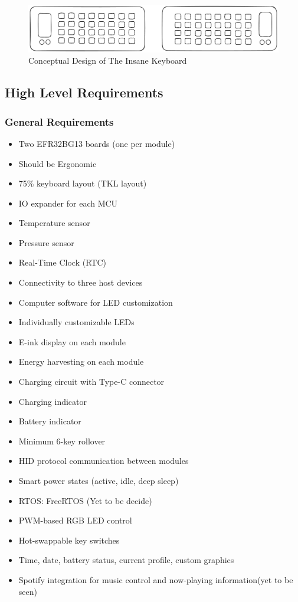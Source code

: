 \documentclass[a4paper,11pt]{article}%
\begin{document}
\begin{figure}[H]
    \centering
    \includegraphics[scale=0.38]{figures/concept.png}
    \caption{Conceptual Design of The Insane Keyboard}
\end{figure}
\vspace{0.2cm}





\subsection{High Level Requirements}


\subsubsection{General Requirements}
\begin{itemize}
\item Two EFR32BG13 boards (one per module)
\item Should be Ergonomic
\item 75\% keyboard layout (TKL layout)
\item IO expander for each MCU
\item Temperature sensor
\item Pressure sensor
\item Real-Time Clock (RTC)
\item Connectivity to three host devices
\item Computer software for LED customization
\item Individually customizable LEDs
\item E-ink display on each module
\item Energy harvesting on each module
\item Charging circuit with Type-C connector
\item Charging indicator
\item Battery indicator
\item Minimum 6-key rollover
\item HID protocol communication between modules
\item Smart power states (active, idle, deep sleep)
\item RTOS: FreeRTOS (Yet to be decide)
\item PWM-based RGB LED control
\item Hot-swappable key switches
\item Time, date, battery status, current profile, custom graphics
\item Spotify integration for music control and now-playing information(yet to be seen)
\end{itemize}
\end{document}
